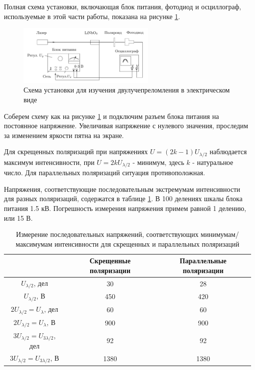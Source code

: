 \documentclass[a4paper,12pt]{article}
\begin{document}
Полная схема установки, включающая блок питания, фотодиод и осциллограф, используемые в этой части работы, показана на рисунке \ref{full}. 

\begin{figure}[h]
	\centering	
	\includegraphics[width=0.6\textwidth]{fullpic.png}
	\caption{Схема установки для изучения двулучепреломления в электрическом виде}
	\label{full}
\end{figure}

Соберем схему как на рисунке \ref{full} и подключим разъем блока питания на постоянное напряжение. Увеличивая напряжение с нулевого значения, проследим за изменением яркости пятна на экране. 

Для скрещенных поляризаций при напряжениях $U = (2k - 1)U_{\lambda/2}$ наблюдается максимум интенсивности, при $U = 2kU_{\lambda/2}$ - минимум, здесь $k$ - натуральное число. Для параллельных поляризаций ситуация противоположная. 

Напряжения, соответствующие последовательным экстремумам интенсивности для разных поляризаций, содержатся в таблице \ref{vol}.	В 100 делениях шкалы блока питания 1.5 кВ. Погрешность измерения напряжения примем равной 1 делению, или 15 В. 

\begin{table}[h]
	\centering
	\begin{tabular}{|c|c|c|}
		\hline
		&Скрещенные поляризации&Параллельные поляризации\\
		\hline
		$U_{\lambda/2}$, дел&30&28\\
		\hline
		$U_{\lambda/2}$, В&450&420\\
		\hline
		$2U_{\lambda/2} = U_\lambda$, дел&60&60\\
		\hline
		$2U_{\lambda/2} = U_\lambda$, В&900&900\\
		\hline
		$3U_{\lambda/2} = U_{3\lambda/2}$, дел&92&92\\
		\hline
		$3U_{\lambda/2} = U_{3\lambda/2}$, В&1380&1380\\
		\hline
	\end{tabular}
	\caption{Измерение последовательных напряжений, соответствующих минимумам/максимумам интенсивности для скрещенных и параллельных поляризаций}
	\label{vol}
\end{table}	
\end{document}
